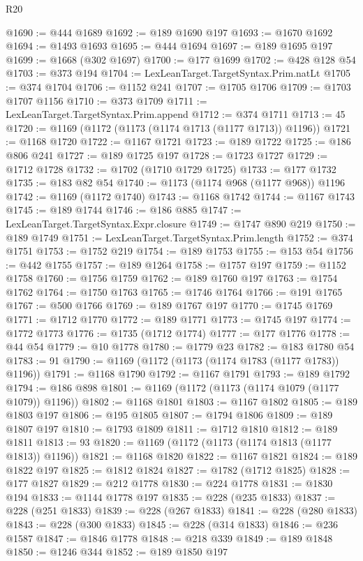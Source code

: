\begin{lexlean}{R20}
\begin{coremodule}
@1690 := @444 @1689
@1692 := @189 @1690 @197
@1693 := @1670 @1692
@1694 := @1493 @1693
@1695 := @444 @1694
@1697 := @189 @1695 @197
@1699 := @1668 (@302 @1697)
@1700 := @177 @1699
@1702 := @428 @128 @54
@1703 := @373 @194
@1704 := LexLeanTarget.TargetSyntax.Prim.natLt
@1705 := @374 @1704
@1706 := @1152 @241
@1707 := @1705 @1706
@1709 := @1703 @1707 @1156
@1710 := @373 @1709
@1711 := LexLeanTarget.TargetSyntax.Prim.append
@1712 := @374 @1711
@1713 := 45
@1720 := @1169 (@1172 (@1173 (@1174 @1713 (@1177 @1713)) @1196))
@1721 := @1168 @1720
@1722 := @1167 @1721
@1723 := @189 @1722
@1725 := @186 @806 @241
@1727 := @189 @1725 @197
@1728 := @1723 @1727
@1729 := @1712 @1728
@1732 := @1702 (@1710 @1729 @1725)
@1733 := @177 @1732
@1735 := @183 @82 @54
@1740 := @1173 (@1174 @968 (@1177 @968)) @1196
@1742 := @1169 (@1172 @1740)
@1743 := @1168 @1742
@1744 := @1167 @1743
@1745 := @189 @1744
@1746 := @186 @885
@1747 := LexLeanTarget.TargetSyntax.Expr.closure
@1749 := @1747 @890 @219
@1750 := @189 @1749
@1751 := LexLeanTarget.TargetSyntax.Prim.length
@1752 := @374 @1751
@1753 := @1752 @219
@1754 := @189 @1753
@1755 := @153 @54
@1756 := @442 @1755
@1757 := @189 @1264
@1758 := @1757 @197
@1759 := @1152 @1758
@1760 := @1756 @1759
@1762 := @189 @1760 @197
@1763 := @1754 @1762
@1764 := @1750 @1763
@1765 := @1746 @1764
@1766 := @191 @1765
@1767 := @500 @1766
@1769 := @189 @1767 @197
@1770 := @1745 @1769
@1771 := @1712 @1770
@1772 := @189 @1771
@1773 := @1745 @197
@1774 := @1772 @1773
@1776 := @1735 (@1712 @1774)
@1777 := @177 @1776
@1778 := @44 @54
@1779 := @10 @1778
@1780 := @1779 @23
@1782 := @183 @1780 @54
@1783 := 91
@1790 := @1169 (@1172 (@1173 (@1174 @1783 (@1177 @1783)) @1196))
@1791 := @1168 @1790
@1792 := @1167 @1791
@1793 := @189 @1792
@1794 := @186 @898
@1801 := @1169 (@1172 (@1173 (@1174 @1079 (@1177 @1079)) @1196))
@1802 := @1168 @1801
@1803 := @1167 @1802
@1805 := @189 @1803 @197
@1806 := @195 @1805
@1807 := @1794 @1806
@1809 := @189 @1807 @197
@1810 := @1793 @1809
@1811 := @1712 @1810
@1812 := @189 @1811
@1813 := 93
@1820 := @1169 (@1172 (@1173 (@1174 @1813 (@1177 @1813)) @1196))
@1821 := @1168 @1820
@1822 := @1167 @1821
@1824 := @189 @1822 @197
@1825 := @1812 @1824
@1827 := @1782 (@1712 @1825)
@1828 := @177 @1827
@1829 := @212 @1778
@1830 := @224 @1778
@1831 := @1830 @194
@1833 := @1144 @1778 @197
@1835 := @228 (@235 @1833)
@1837 := @228 (@251 @1833)
@1839 := @228 (@267 @1833)
@1841 := @228 (@280 @1833)
@1843 := @228 (@300 @1833)
@1845 := @228 (@314 @1833)
@1846 := @236 @1587
@1847 := @1846 @1778
@1848 := @218 @339
@1849 := @189 @1848
@1850 := @1246 @344
@1852 := @189 @1850 @197

\end{coremodule}
\end{lexlean}
